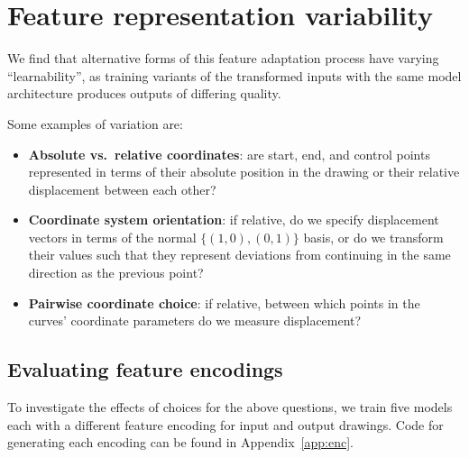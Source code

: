 \chapter{Feature representation variability}\label{chap:feature-variation}
We find that alternative forms of this feature adaptation process have varying ``learnability'', as training variants of the transformed inputs with the same model architecture produces outputs of differing quality.

Some examples of variation are:
\begin{itemize}
\item \textbf{Absolute vs.\ relative coordinates}: are start, end, and control points represented in terms of their absolute position in the drawing or their relative displacement between each other?
\item \textbf{Coordinate system orientation}: if relative, do we specify displacement vectors in terms of the normal $\{(1, 0), (0, 1)\}$ basis, or do we transform their values such that they represent deviations from continuing in the same direction as the previous point?
\item \textbf{Pairwise coordinate choice}: if relative, between which points in the curves' coordinate parameters do we measure displacement?
\end{itemize}

\section{Evaluating feature encodings}\label{sec:eval-encs}
To investigate the effects of choices for the above questions, we train five models each with a different feature encoding for input and output drawings.
Code for generating each encoding can be found in Appendix~\ref{app:enc}.

